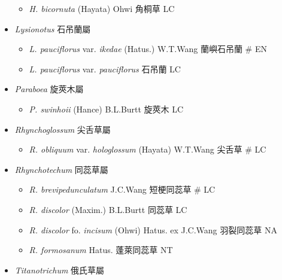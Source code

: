 \begin{itemize}
  \begin{itemize}
        \item[] \textit{H. bicornuta} (Hayata) Ohwi  角桐草   LC
  \end{itemize}
 \item[] \textit{Lysionotus} 石吊蘭屬
                                
  \begin{itemize}
        \item[] \textit{L. pauciflorus} var. \textit{ikedae} (Hatus.) W.T.Wang  蘭嶼石吊蘭  \# EN
        \item[] \textit{L. pauciflorus} var. \textit{pauciflorus}   石吊蘭   LC
  \end{itemize}
 \item[] \textit{Paraboea} 旋莢木屬
                                
  \begin{itemize}
        \item[] \textit{P. swinhoii} (Hance) B.L.Burtt  旋莢木   LC
  \end{itemize}
 \item[] \textit{Rhynchoglossum} 尖舌草屬
                                
  \begin{itemize}
        \item[] \textit{R. obliquum} var. \textit{hologlossum} (Hayata) W.T.Wang  尖舌草  \# LC
  \end{itemize}
 \item[] \textit{Rhynchotechum} 同蕊草屬
                                
  \begin{itemize}
        \item[] \textit{R. brevipedunculatum} J.C.Wang  短梗同蕊草  \# LC
        \item[] \textit{R. discolor} (Maxim.) B.L.Burtt  同蕊草   LC
        \item[] \textit{R. discolor} fo. \textit{incisum} (Ohwi) Hatus. ex J.C.Wang  羽裂同蕊草   NA
        \item[] \textit{R. formosanum} Hatus.  蓬萊同蕊草   NT
  \end{itemize}
 \item[] \textit{Titanotrichum} 俄氏草屬
                                

\end{itemize}
